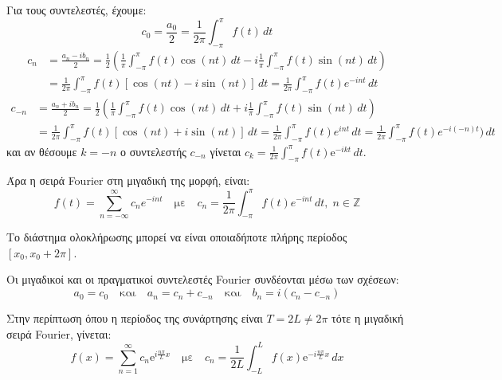 \documentclass[a4paper,table]{report}
\begin{document}
      Για τους συντελεστές, έχουμε:
      \[
        c_{0} = \frac{a_{0}}{2} = \frac{1}{2\pi} \int _{- \pi }^{\pi} f(t) \,{dt}
      \] 
      \begin{align*}
        c_{n} &= \frac{a_{n}-ib_{n}}{2} = \frac{1}{2} 
        \left(\frac{1}{\pi} \int _{- \pi }^{\pi } f(t) \cos{(nt)} \,{dt} - i
        \frac{1}{\pi} \int _{- \pi }^{\pi } f(t) \sin{(nt)} \,{dt}  \right) \\ 
              &= \frac{1}{2 \pi} \int _{- \pi }^{\pi} f(t) [\cos{(nt)} - i \sin{(nt)}] 
              \,{dt} = \frac{1}{2 \pi} \int _{- \pi }^{\pi } f(t) e^{-int} \,{dt}
      \end{align*} 
      \begin{align*}
        c_{-n} &= \frac{a_{n}+ib_{n}}{2} = \frac{1}{2} 
        \left(\frac{1}{\pi} \int _{- \pi }^{\pi } f(t) \cos{(nt)} \,{dt} + i
        \frac{1}{\pi} \int _{- \pi }^{\pi } f(t) \sin{(nt)} \,{dt}  \right) \\ 
               &= \frac{1}{2 \pi} \int _{- \pi }^{\pi} f(t) [\cos{(nt)} + i \sin{(nt)}] 
               \,{dt} = \frac{1}{2 \pi} \int _{- \pi }^{\pi } f(t) e^{int} \,{dt} = 
               \frac{1}{2 \pi} \int _{- \pi }^{\pi } f(t) e^{-i(-n)t}) \,{dt} 
      \end{align*}
      και αν θέσουμε $ k=-n $ ο συντελεστής $ c_{-n} $ γίνεται $ c_{k} =
      \frac{1}{2 \pi} \int _{- \pi }^{\pi} f(t) \mathrm{e}^{-ikt}\,{dt} $.

      Άρα η σειρά Fourier στη μιγαδική της μορφή, είναι:
      \[
        \boxed{f(t) = \sum_{n=- \infty}^{\infty} c_{n} e^{-int} \quad \text{με} \quad c_{n} =
        \frac{1}{2 \pi} \int _{- \pi}^{\pi } f(t) e^{-int} \,{dt}, \; n \in \mathbb{Z}}
      \]

      \begin{rem}
        Το διάστημα ολοκλήρωσης μπορεί να είναι οποιαδήποτε πλήρης περίοδος $ [x_{0},
        x_{0}+ 2 \pi] $. 
      \end{rem}

      \begin{rem}
        Οι μιγαδικοί και οι πραγματικοί συντελεστές Fourier συνδέονται μέσω των σχέσεων:
        \begin{equation}\label{eq:complex_coef}
          a_{0}= c_{0} \quad \text{και} \quad a_{n}= c_{n}+c_{-n} \quad \text{και} \quad 
          b_{n} = i(c_{n}-c_{-n})
        \end{equation} 
      \end{rem}

      \begin{rem}
        Στην περίπτωση όπου η περίοδος της συνάρτησης είναι $ T=2L \neq 2 \pi $ τότε 
        η μιγαδική σειρά Fourier, γίνεται:
        \[
          f(x) = \sum_{n=1}^{\infty} c_{n} \mathrm{e}^{i \frac{n \pi}{L} x} \quad
          \text{με} \quad c_{n} = \frac{1}{2L} \int _{-L}^{L} f(x) \mathrm{e}^{-i
          \frac{n \pi}{L} x}
          \,{dx}  
        \]
      \end{rem}
\end{document}

